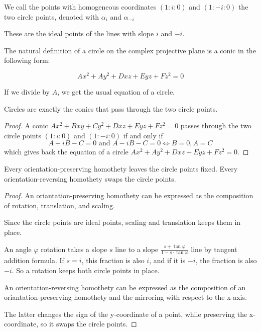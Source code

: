 \documentclass[a4paper]{article}
\begin{document}
\begin{definition}
    We call the points with homogeneous coordinates $(1:i:0)$ and $(1:-i:0)$ the two circle points, denoted with $\alpha_i$ and $\alpha_{-i}$
\end{definition}

These are the ideal points of the lines with slope $i$ and $-i$.

The natural definition of a circle on the complex projective plane is a conic in the following form:

$$Ax^2+Ay^2+Dxz+Eyz+Fz^2=0$$

If we divide by $A$, we get the usual equation of a circle.

\begin{lemma}
    Circles are exactly the conics that pass through the two circle points.
\end{lemma}
\begin{proof}
    A conic $Ax^2+Bxy+Cy^2+Dxz+Eyz+Fz^2=0$ passes through the two circle points $(1:i:0)$ and $(1:-i:0)$ if and only if
    $$A+iB-C=0\text{ and }A-iB-C=0\iff B=0, A=C$$
    which gives back the equation of a circle $Ax^2+Ay^2+Dxz+Eyz+Fz^2=0$.
\end{proof}

\begin{lemma}
    Every orientation-preserving homothety leaves the circle points fixed. Every orientation-reversing homothety swaps the circle points.
\end{lemma}
\begin{proof}
    An oriantation-preserving homothety can be expressed as the composition of rotation, translation, and scaling.
    
    Since the circle points are ideal points, scaling and translation keeps them in place.

    An angle $\varphi$ rotation takes a slope $s$ line to a slope $\frac{s+\tan \varphi}{1-s\cdot \tan \varphi}$ line by tangent addition formula. If $s=i$, this fraction is also $i$, and if it is $-i$, the fraction is also $-i$. So a rotation keeps both circle points in place.

    An orientation-reversing homothety can be expressed as the composition of an oriantation-preserving homothety and the mirroring with respect to the x-axis.

    The latter changes the sign of the y-coordinate of a point, while preserving the x-coordinate, so it swaps the circle points.
\end{proof}
\end{document}
